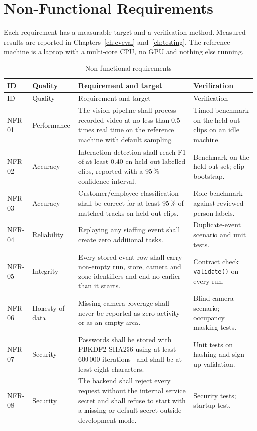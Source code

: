 \section{Non-Functional Requirements}
Each requirement has a measurable target and a verification method. Measured results are reported in Chapters~\ref{ch:cveval} and~\ref{ch:testing}. The reference machine is a laptop with a multi-core CPU, no GPU and nothing else running.

\begin{longtable}{P{0.095\textwidth}P{0.17\textwidth}P{0.4\textwidth}P{0.24\textwidth}}
\caption{Non-functional requirements}\label{tab:nfr}\\
\toprule
ID & Quality & Requirement and target & Verification\\
\midrule
\endfirsthead
\toprule
ID & Quality & Requirement and target & Verification\\
\midrule
\endhead
\bottomrule
\endfoot
NFR-01 & Performance & The vision pipeline shall process recorded video at no less than 0.5 times real time on the reference machine with default sampling. & Timed benchmark on the held-out clips on an idle machine.\\
NFR-02 & Accuracy & Interaction detection shall reach F1 of at least 0.40 on held-out labelled clips, reported with a 95\,\% confidence interval. & Benchmark on the held-out set; clip bootstrap.\\
NFR-03 & Accuracy & Customer/employee classification shall be correct for at least 95\,\% of matched tracks on held-out clips. & Role benchmark against reviewed person labels.\\
NFR-04 & Reliability & Replaying any staffing event shall create zero additional tasks. & Duplicate-event scenario and unit tests.\\
NFR-05 & Integrity & Every stored event row shall carry non-empty run, store, camera and zone identifiers and end no earlier than it starts. & Contract check \texttt{validate()} on every run.\\
NFR-06 & Honesty of data & Missing camera coverage shall never be reported as zero activity or as an empty area. & Blind-camera scenario; occupancy masking tests.\\
NFR-07 & Security & Passwords shall be stored with PBKDF2-SHA256 using at least 600\,000 iterations~\cite{owaspPasswords} and shall be at least eight characters. & Unit tests on hashing and sign-up validation.\\
NFR-08 & Security & The backend shall reject every request without the internal service secret and shall refuse to start with a missing or default secret outside development mode. & Security tests; startup test.\\

\end{longtable}
